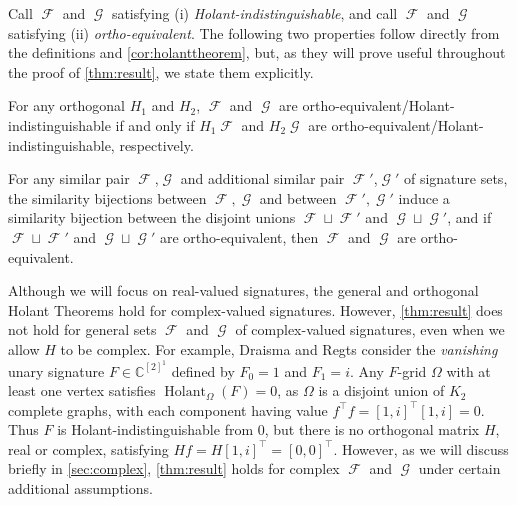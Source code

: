 \documentclass{article}
\DeclareMathOperator{\fc}{\mathcal{F}}
\DeclareMathOperator{\gc}{\mathcal{G}}
\DeclareMathOperator{\holant}{Holant}
\begin{document}
Call $\fc$ and $\gc$ satisfying (i) \emph{Holant-indistinguishable}, and call $\fc$ and
$\gc$ satisfying (ii) \emph{ortho-equivalent}. 
The following two properties follow directly from the definitions and \autoref{cor:holanttheorem},
but, as they will
prove useful throughout the proof of \autoref{thm:result}, we state them explicitly.
\begin{proposition}
    For any orthogonal $H_1$ and $H_2$, $\fc$ and $\gc$ are 
    ortho-equivalent/Holant-indistinguishable if and only if
    $H_1\fc$ and $H_2\gc$ are ortho-equivalent/Holant-indistinguishable, respectively.
    \label{prop:transform}
\end{proposition}
\begin{proposition}
    For any similar pair $\fc$,$\gc$ and additional similar pair $\fc'$,$\gc'$ 
    of signature sets, the similarity bijections between $\fc,\gc$ and between $\fc',\gc'$
    induce a similarity bijection between the disjoint unions 
    $\fc \sqcup \fc'$ and $\gc \sqcup \gc'$, and if
    $\fc \sqcup \fc'$ and $\gc \sqcup \gc'$ 
    are ortho-equivalent, then $\fc$ and $\gc$ are ortho-equivalent.
    \label{prop:union}
\end{proposition}   

\begin{remark}\label{rem:complex}
Although we will focus on real-valued signatures, the general and orthogonal 
Holant Theorems hold for complex-valued signatures. However,
\autoref{thm:result} does not hold for general sets $\fc$ and $\gc$ of complex-valued
signatures, even when we allow $H$ to be complex. For example, Draisma and Regts
\cite{draisma_tensor_2013} consider the \emph{vanishing} unary signature $F \in \mathbb{C}^{[2]^1}$
defined by $F_0 = 1$ and $F_1 = i$. Any $F$-grid $\Omega$ with at least
one vertex satisfies $\holant_\Omega(F) = 0$, as $\Omega$ is a disjoint union of $K_2$ complete graphs,
with each component having value $f^\top f = [1,i]^\top [1,i] = 0$. 
Thus $F$ is Holant-indistinguishable from 0, but
there is no orthogonal matrix $H$, real or complex, satisfying $Hf = H [1,i]^\top = [0,0]^\top$.
However, as we will discuss briefly in \autoref{sec:complex}, \autoref{thm:result} holds for
complex $\fc$ and $\gc$ under certain additional assumptions.
\end{remark}
\end{document}
